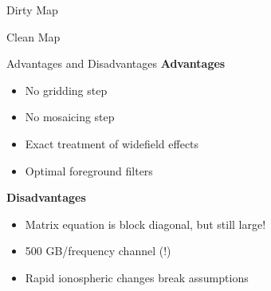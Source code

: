 \documentclass{beamer}
\begin{document}
{
    \begin{frame}{Dirty Map}
    \end{frame}

    \begin{frame}{Clean Map}
    \end{frame}
}

\begin{frame}{Advantages and Disadvantages}
    \textbf{Advantages}
    \begin{itemize}[label=\textbullet]
        \item No gridding step
        \item No mosaicing step
        \item Exact treatment of widefield effects
        \item Optimal foreground filters
    \end{itemize}
    \textbf{Disadvantages}
    \begin{itemize}[label=\textbullet]
        \item Matrix equation is block diagonal, but still large!
        \item 500 GB/frequency channel (!)
        \item Rapid ionospheric changes break assumptions
    \end{itemize}
\end{frame}
\end{document}
